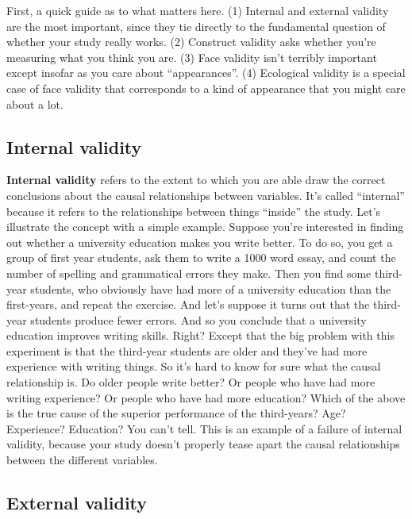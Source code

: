 \documentclass[
  letterpaper,
]{book}
\begin{document}
First, a quick guide as to what matters here. (1) Internal and external
validity are the most important, since they tie directly to the
fundamental question of whether your study really works. (2) Construct
validity asks whether you're measuring what you think you are. (3) Face
validity isn't terribly important except insofar as you care about
``appearances''. (4) Ecological validity is a special case of face
validity that corresponds to a kind of appearance that you might care
about a lot.

\hypertarget{internal-validity}{%
\subsection{Internal validity}\label{internal-validity}}

\textbf{Internal validity} refers to the extent to which you are able
draw the correct conclusions about the causal relationships between
variables. It's called ``internal'' because it refers to the
relationships between things ``inside'' the study. Let's illustrate the
concept with a simple example. Suppose you're interested in finding out
whether a university education makes you write better. To do so, you get
a group of first year students, ask them to write a 1000 word essay, and
count the number of spelling and grammatical errors they make. Then you
find some third-year students, who obviously have had more of a
university education than the first-years, and repeat the exercise. And
let's suppose it turns out that the third-year students produce fewer
errors. And so you conclude that a university education improves writing
skills. Right? Except that the big problem with this experiment is that
the third-year students are older and they've had more experience with
writing things. So it's hard to know for sure what the causal
relationship is. Do older people write better? Or people who have had
more writing experience? Or people who have had more education? Which of
the above is the true cause of the superior performance of the
third-years? Age? Experience? Education? You can't tell. This is an
example of a failure of internal validity, because your study doesn't
properly tease apart the causal relationships between the different
variables.

\hypertarget{external-validity}{%
\subsection{External validity}\label{external-validity}}
\end{document}
